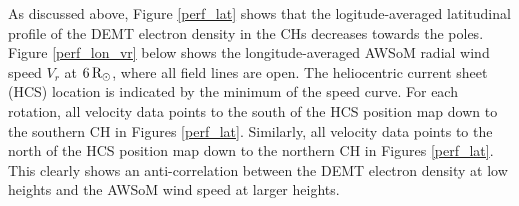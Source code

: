 \documentclass[namedreferences]{solarphysics}
\newcommand{\mrsun}{{\rm R_\odot}}
\def\notebyalbert#1{\textcolor{blue}{NOTE: #1}}
\begin{document}
\begin{article}
{As discussed above, Figure \ref{perf_lat} shows that the logitude-averaged latitudinal profile of the DEMT electron density in the CHs decreases towards the poles. Figure \ref{perf_lon_vr} below shows the longitude-averaged AWSoM radial wind speed $V_r$ at $6\,\mrsun$, where all field lines are open. The heliocentric current sheet (HCS) location is indicated by the minimum of the speed curve. For each rotation, all velocity data points to the south of the HCS position map down to the southern CH in Figures \ref{perf_lat}. Similarly, all velocity data points to the north of the HCS position map down to the northern CH in Figures \ref{perf_lat}. This clearly shows an anti-correlation between the DEMT electron density at low heights and the AWSoM wind speed at larger heights.}



\end{article}
\end{document}
